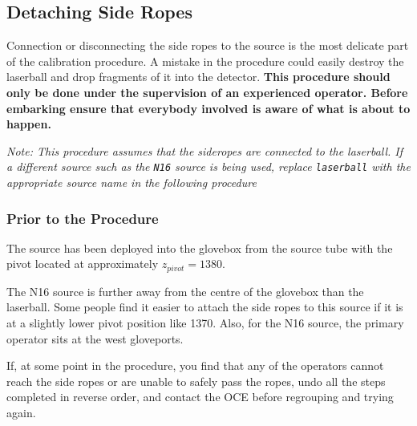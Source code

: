 \documentclass[11pt]{article}
\begin{document}
\subsection{Detaching Side Ropes}

Connection or disconnecting the side ropes to the source is the most delicate part of the calibration procedure. A mistake in the procedure could easily destroy the laserball and drop fragments of it into the detector. {\bf This procedure should only be done under the supervision of an experienced operator. Before embarking ensure that everybody involved is aware of what is about to happen.}

{\it  Note: This procedure assumes that the sideropes  are connected to the laserball. If a different source such as the \verb+N16+ source is being used, replace \verb+laserball+ with the appropriate source name in the following procedure}

\subsubsection{Prior to the Procedure}
 The source has been deployed into the glovebox from the source tube with the pivot located at approximately $z_{pivot}=1380$.

The N16 source is further away from the centre of the glovebox than the laserball. Some people find it easier to attach the side ropes to this source if it is at a slightly lower pivot position like 1370. Also, for the N16 source, the primary operator sits at the west gloveports.

If, at some point in the procedure, you find that any of the operators cannot reach the side ropes or are unable to safely pass the ropes, undo all the steps completed in reverse order, and contact the OCE before regrouping and trying again.
\end{document}
